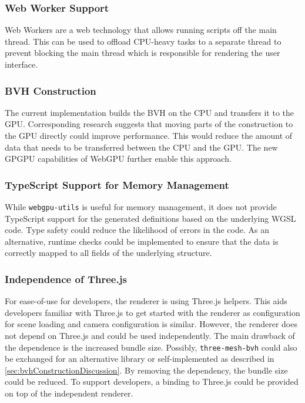 \subsubsection*{Web Worker Support}

Web Workers are a web technology that allows running scripts off the main thread. This can be used to offload \gls{CPU}-heavy tasks to a separate thread to prevent blocking the main thread which is responsible for rendering the user interface.

\subsubsection*{BVH Construction}
\label{sec:bvhConstructionDiscussion}

The current implementation builds the \gls{BVH} on the \gls{CPU} and transfers it to the \gls{GPU}. Corresponding research \cite{lauterbach2009GPUbvh} suggests that moving parts of the construction to the \gls{GPU} directly could improve performance. This would reduce the amount of data that needs to be transferred between the \gls{CPU} and the \gls{GPU}. The new \gls{GPGPU} capabilities of \gls{WebGPU} further enable this approach.

\subsubsection*{TypeScript Support for Memory Management}

While \texttt{webgpu-utils} \cite{webgpuUtilsLib} is useful for memory management, it does not provide TypeScript support for the generated definitions based on the underlying \gls{WGSL} code. Type safety could reduce the likelihood of errors in the code. As an alternative, runtime checks could be implemented to ensure that the data is correctly mapped to all fields of the underlying structure.

\subsubsection*{Independence of Three.js}

For ease-of-use for developers, the renderer is using \gls{Three.js} helpers. This aids developers familiar with \gls{Three.js} to get started with the renderer as configuration for scene loading and camera configuration is similar. However, the renderer does not depend on \gls{Three.js} and could be used independently. The main drawback of the dependence is the increased bundle size. Possibly, \texttt{three-mesh-bvh} \cite{threeMeshBvh} could also be exchanged for an alternative library or self-implemented as described in \autoref{sec:bvhConstructionDiscussion}. By removing the dependency, the bundle size could be reduced. To support developers, a binding to \gls{Three.js} could be provided on top of the independent renderer.

